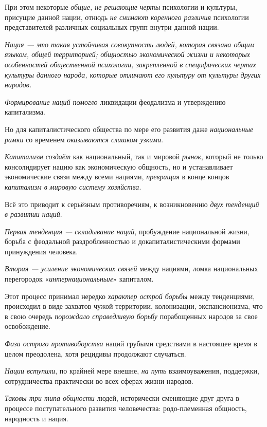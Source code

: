 \documentclass[a4paper,14pt,russian]{extreport}
\begin{document}
При этом некоторые \emph{общие, не решающие черты} психологии и культуры, присущие данной нации, отнюдь \emph{не снимают коренного различия} психологии представителей различных социальных групп внутри данной нации.

\emph{Нация --- это такая устойчивая совокупность людей, которая связана общим языком, общей территорией; общностью экономической жизни и некоторых особенностей общественной психологии, закрепленной в специфических чертах культуры данного народа, которые отличают его культуру от культуры других народов.}

\emph{Формирование наций помогло} ликвидации феодализма и утверждению капитализма.

Но для капиталистического общества по мере его развития даже \emph{национальные рамки} со временем \emph{оказываются слишком узкими}.

\emph{Капитализм создаёт} как национальный, так и мировой \emph{рынок}, который не только консолидирует нацию как экономическую общность, но и устанавливает экономические связи между всеми нациями, \emph{превращая} в конце концов \emph{капитализм в мировую систему хозяйства}.

Всё это приводит к серьёзным противоречиям, к возникновению \emph{двух тенденций в развитии наций}.

\emph{Первая тенденция --- складывание наций}, пробуждение национальной жизни, борьба с феодальной раздробленностью и докапиталистическими формами принуждения человека.

\emph{Вторая --- усиление экономических связей} между нациями, ломка национальных перегородок «\emph{интернациональным}» капиталом.

Этот процесс принимал нередко \emph{характер острой борьбы} между тенденциями, происходил в виде захватов чужой территории, колонизации, экспансионизма, что в свою очередь \emph{порождало справедливую борьбу} порабощенных народов за свое освобождение.

\emph{Фаза острого противоборства} наций грубыми средствами в настоящее время в целом преодолена, хотя рецидивы продолжают случаться.

\emph{Нации вступили}, по крайней мере внешне, \emph{на путь} взаимоуважения, поддержки, сотрудничества практически во всех сферах жизни народов.

\emph{Таковы три типа общности} людей, исторически сменяющие друг друга в процессе поступательного развития человечества: родо-племенная общность, народность и нация.
\end{document}
